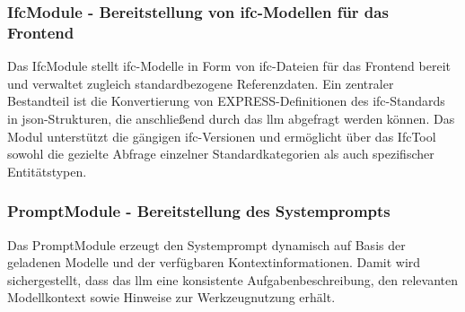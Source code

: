 \subsubsection{IfcModule - Bereitstellung von \gls{ifc}-Modellen für das Frontend}
\label{sec:app-ifcmodule}

Das IfcModule stellt \gls{ifc}-Modelle in Form von \gls{ifc}-Dateien für das Frontend bereit und verwaltet zugleich standardbezogene Referenzdaten.
Ein zentraler Bestandteil ist die Konvertierung von EXPRESS-Definitionen des \gls{ifc}-Standards in \gls{json}-Strukturen, die anschließend durch das \gls{llm} abgefragt werden können.
Das Modul unterstützt die gängigen \gls{ifc}-Versionen und ermöglicht über das IfcTool sowohl die gezielte Abfrage einzelner Standardkategorien als auch spezifischer Entitätstypen.

\subsubsection{PromptModule - Bereitstellung des Systemprompts}
\label{sec:app-promptmodule}

Das PromptModule erzeugt den Systemprompt dynamisch auf Basis der geladenen Modelle und der verfügbaren Kontextinformationen.
Damit wird sichergestellt, dass das \gls{llm} eine konsistente Aufgabenbeschreibung, den relevanten Modellkontext sowie Hinweise zur Werkzeugnutzung erhält.

